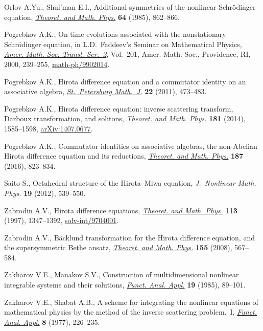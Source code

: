 \documentclass[pdftex]{sigma}
\numberwithin{equation}{section}
\begin{document}
\begin{thebibliography}{99}
Orlov A.Yu., Shul'man E.I., Additional symmetries of the nonlinear Schr\"odinger
 equation, \href{https://doi.org/10.1007/BF01017968}{\textit{Theoret. and Math. Phys.}} \textbf{64} (1985), 862--866.

Pogrebkov A.K., On time evolutions associated with the nonstationary
 {S}chr\"odinger equation, in L.{D}.~{F}addeev's {S}eminar on {M}athematical
 {P}hysics, \href{https://doi.org/10.1090/trans2/201/13}{\textit{Amer. Math. Soc. Transl. Ser.~2}}, Vol.~201, Amer. Math.
 Soc., Providence, RI, 2000, 239--255, \href{https://arxiv.org/abs/math-ph/9902014}{math-ph/9902014}.

Pogrebkov A.K., Hirota dif\/ference equation and a commutator identity on an
 associative algebra, \href{https://doi.org/10.1090/S1061-0022-2011-01153-7}{\textit{St.~Petersburg Math.~J.}} \textbf{22} (2011),
 473--483.

Pogrebkov A.K., Hirota dif\/ference equation: inverse scattering transform,
 {D}arboux transformation, and solitons, \href{https://doi.org/10.1007/s11232-014-0237-z}{\textit{Theoret. and Math. Phys.}}
 \textbf{181} (2014), 1585--1598, \href{https://arxiv.org/abs/1407.0677}{arXiv:1407.0677}.

Pogrebkov A.K., Commutator identities on associative algebras, the
 non-{A}belian {H}irota dif\/ference equation and its reductions,
 \href{https://doi.org/10.1134/S0040577916060039}{\textit{Theoret. and Math. Phys.}} \textbf{187} (2016), 823--834.

Saito S., Octahedral structure of the {H}irota--{M}iwa equation,
 \textit{J.~Nonlinear Math. Phys.} \textbf{19} (2012), 539--550.

Zabrodin A.V., Hirota dif\/ference equations, \href{https://doi.org/10.1007/BF02634165}{\textit{Theoret. and Math. Phys.}}
 \textbf{113} (1997), 1347--1392, \mbox{\href{https://arxiv.org/abs/solv-int/9704001}{solv-int/9704001}}.

Zabrodin A.V., B\"acklund transformation for the {H}irota dif\/ference equation,
 and the supersymmetric {B}ethe ansatz, \href{https://doi.org/10.1007/s11232-008-0047-2}{\textit{Theoret. and Math. Phys.}}
 \textbf{155} (2008), 567--584.

Zakharov V.E., Manakov S.V., Construction of multidimensional nonlinear
 integrable systems and their solutions, \href{https://doi.org/10.1007/BF01078388}{\textit{Funct. Anal. Appl.}}
 \textbf{19} (1985), 89--101.

Zakharov V.E., Shabat A.B., A scheme for integrating the nonlinear equations of
 mathematical physics by the method of the inverse scattering problem.~I,
 \href{https://doi.org/10.1007/BF01075696}{\textit{Funct. Anal. Appl.}} \textbf{8} (1977), 226--235.

\end{thebibliography}\LastPageEnding
\end{document}
